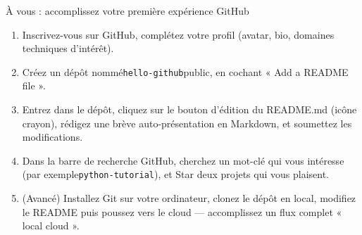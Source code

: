 \begin{tcbpractice}{À vous : accomplissez votre première expérience GitHub}
\begin{enumerate}
  \item Inscrivez-vous sur GitHub, complétez votre profil (avatar, bio, domaines techniques d'intérêt).
  \item Créez un dépôt nommé\texttt{hello-\allowbreak github}public, en cochant « Add a README file ».
  \item Entrez dans le dépôt, cliquez sur le bouton d'édition du README.md (icône crayon), rédigez une brève auto-présentation en Markdown, et soumettez les modifications.
  \item Dans la barre de recherche GitHub, cherchez un mot-clé qui vous intéresse (par exemple\texttt{python-\allowbreak tutorial}), et Star deux projets qui vous plaisent.
  \item (Avancé) Installez Git sur votre ordinateur, clonez le dépôt en local, modifiez le README puis poussez vers le cloud — accomplissez un flux complet « local cloud ».
\end{enumerate}

\end{tcbpractice}
